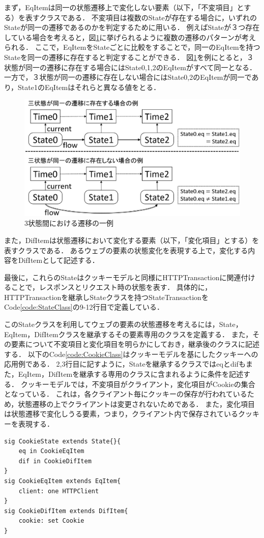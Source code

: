 \documentclass[12pt,a4paper]{jbook}
\begin{document}
まず，EqItemは同一の状態遷移上で変化しない要素（以下，「不変項目」とする）を表すクラスである．
不変項目は複数のStateが存在する場合に，いずれのStateが同一の遷移であるのかを判定するために用いる．
例えばStateが３つ存在している場合を考えると，図\ref{fig:ProposedModel-3StateFlow}に挙げられるように複数の遷移のパターンが考えられる．
ここで，EqItemをStateごとに比較をすることで，同一のEqItemを持つStateを同一の遷移に存在すると判定することができる．
図\ref{fig:ProposedModel-3StateFlow}を例にとると，３状態が同一の遷移に存在する場合にはState0,1,2のEqItemがすべて同一となる．
一方で，３状態が同一の遷移に存在しない場合にはState0,2のEqItemが同一であり，State1のEqItemはそれらと異なる値をとる．

\begin{figure}[htb]
\centering
\includegraphics[width=400pt]{./fig/ProposedModel-3StateFlow.eps}
\caption{3状態間における遷移の一例}
\label{fig:ProposedModel-3StateFlow}
\end{figure}

また，DifItemは状態遷移において変化する要素（以下，「変化項目」とする）を表すクラスである．
あるウェブの要素の状態変化を表現する上で，変化する内容をDifItemとして記述する．

最後に，これらのStateはクッキーモデルと同様にHTTPTransactionに関連付けることで，レスポンスとリクエスト時の状態を表す．
具体的に，HTTPTransactionを継承しStateクラスを持つStateTransactionをCode\ref{code:StateClass}の9-12行目で定義している．

このStateクラスを利用してウェブの要素の状態遷移を考えるには，State，EqItem，DifItemクラスを継承するその要素専用のクラスを定義する．
また，その要素について不変項目と変化項目を明らかにしておき，継承後のクラスに記述する．
以下のCode\ref{code:CookieClass}はクッキーモデルを基にしたクッキーへの応用例である．
2,3行目に記すように，Stateを継承するクラスではeqとdifもまた，EqItem，DifItemを継承する専用のクラスに含まれるように条件を記述する．
クッキーモデルでは，不変項目がクライアント，変化項目がCookieの集合となっている．
これは，各クライアント毎にクッキーの保存が行われているため，状態遷移の上でクライアントは変更されないためである．
また，変化項目は状態遷移で変化しうる要素，つまり，クライアント内で保存されているクッキーを表現する．
\begin{lstlisting}[caption=クッキーへの応用例, label=code:CookieClass]
sig CookieState extends State{}{
	eq in CookieEqItem
	dif in CookieDifItem
}
sig CookieEqItem extends EqItem{
	client: one HTTPClient
}
sig CookieDifItem extends DifItem{
	cookie: set Cookie
}
\end{lstlisting}
\end{document}
